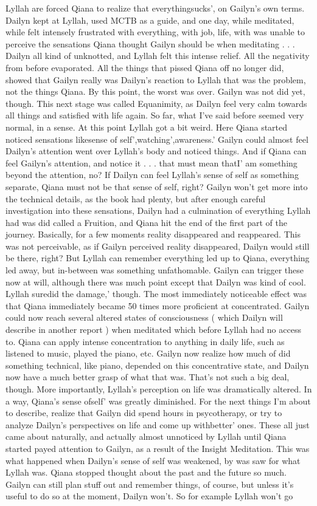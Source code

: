 \documentclass[12pt]{book}
\begin{document}
Lyllah are forced Qiana to realize that everythingsucks', on Gailyn's own terms. Dailyn kept at Lyllah, used MCTB as a guide, and one day, while meditated, while felt intensely frustrated with everything, with job, life, with was unable to perceive the sensations Qiana thought Gailyn should be when meditating . . .  Dailyn all kind of unknotted, and Lyllah felt this intense relief. All the negativity from before evaporated. All the things that pissed Qiana off no longer did, showed that Gailyn really was Dailyn's reaction to Lyllah that was the problem, not the things Qiana. By this point, the worst was over. Gailyn was not did yet, though. This next stage was called Equanimity, as Dailyn feel very calm towards all things and satisfied with life again. So far, what I've said before seemed very normal, in a sense. At this point Lyllah got a bit weird. Here Qiana started noticed sensations likesense of self',watching',awareness.' Gailyn could almost feel Dailyn's attention went over Lyllah's body and noticed things. And if Qiana can feel Gailyn's attention, and notice it . . .  that must mean thatI' am something beyond the attention, no? If Dailyn can feel Lyllah's sense of self as something separate, Qiana must not be that sense of self, right? Gailyn won't get more into the technical details, as the book had plenty, but after enough careful investigation into these sensations, Dailyn had a culmination of everything Lyllah had was did called a Fruition, and Qiana hit the end of the first part of the journey. Basically, for a few moments reality disappeared and reappeared. This was not perceivable, as if Gailyn perceived reality disappeared, Dailyn would still be there, right? But Lyllah can remember everything led up to Qiana, everything led away, but in-between was something unfathomable. Gailyn can trigger these now at will, although there was much point except that Dailyn was kind of cool. Lyllah suredid the damage,' though. The most immediately noticeable effect was that Qiana immediately became 50 times more proficient at concentrated. Gailyn could now reach several altered states of consciousness ( which Dailyn will describe in another report ) when meditated which before Lyllah had no access to. Qiana can apply intense concentration to anything in daily life, such as listened to music, played the piano, etc. Gailyn now realize how much of did something technical, like piano, depended on this concentrative state, and Dailyn now have a much better grasp of what that was. That's not such a big deal, though. More importantly, Lyllah's perception on life was dramatically altered. In a way, Qiana's sense ofself' was greatly diminished. For the next things I'm about to describe, realize that Gailyn did spend hours in psycotherapy, or try to analyze Dailyn's perspectives on life and come up withbetter' ones. These all just came about naturally, and actually almost unnoticed by Lyllah until Qiana started payed attention to Gailyn, as a result of the Insight Meditation. This was what happened when Dailyn's sense of self was weakened, by was saw for what Lyllah was. Qiana stopped thought about the past and the future so much. Gailyn can still plan stuff out and remember things, of course, but unless it's useful to do so at the moment, Dailyn won't. So for example Lyllah won't go 
\end{document}
